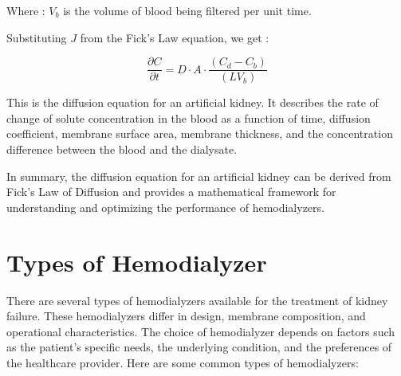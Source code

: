 \documentclass[12pt, a4paper]{article} %
\begin{document}
Where :
$V_b$ is the volume of blood being filtered per unit time.

Substituting $J$ from the Fick's Law equation, we get :

\[\frac{\partial C}{\partial t} = D \cdot A \cdot \frac{(C_d - C_b)}{(LV_b)}\]

This is the diffusion equation for an artificial kidney. It describes the rate of change of solute concentration in the blood as a function of time, diffusion coefficient, membrane surface area, membrane thickness, and the concentration difference between the blood and the dialysate.

In summary, the diffusion equation for an artificial kidney can be derived from Fick's Law of Diffusion and provides a mathematical framework for understanding and optimizing the performance of hemodialyzers.

\section{Types of Hemodialyzer}

\BgThispage

There are several types of hemodialyzers available for the treatment of kidney failure. These hemodialyzers differ in design, membrane composition, and operational characteristics. The choice of hemodialyzer depends on factors such as the patient's specific needs, the underlying condition, and the preferences of the healthcare provider. Here are some common types of hemodialyzers:
\end{document}
